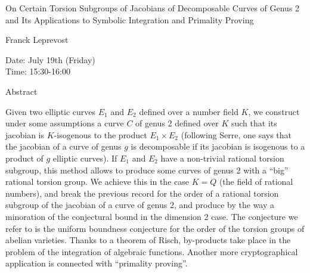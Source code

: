\begin{center}
\LARGE
On Certain Torsion Subgroups of Jacobians of
   Decomposable Curves of Genus 2 and Its Applications to
         Symbolic Integration and Primality Proving 
\end{center}

\begin{center}
\Large
Franck Leprevost
\end{center}

\noindent
Date:  July 19th (Friday)\\
Time:  15:30-16:00\\

\begin{center}
\large
Abstract
\end{center}


Given two elliptic curves $E_1$ and $E_2$ defined over a number field $K$, we construct under
some assumptions a curve $C$ of genus 2 defined over $K$ such that its jacobian is
$K$-isogenous to the product $E_1 \times E_2$ (following Serre, one says that the jacobian of a
curve of genus $g$ is decomposable if its jacobian is isogenous to a product of $g$ elliptic curves).
If $E_1$ and $E_2$ have a non-trivial rational torsion subgroup, this method allows to produce
some curves of genus 2 with a ``big'' rational torsion group. We achieve this in the case $K=Q$
(the field of rational numbers), and break the previous record for the order of a rational torsion
subgroup of the jacobian of a curve of genus 2, and produce by the way a minoration of the
conjectural bound in the dimension 2 case. The conjecture we refer to is the uniform boundness
conjecture for the order of the torsion groups of abelian varieties. Thanks to a theorem of Risch,
by-products take place in the problem of the integration of algebraic functions. Another more
cryptographical application is connected with ``primality proving''. 

